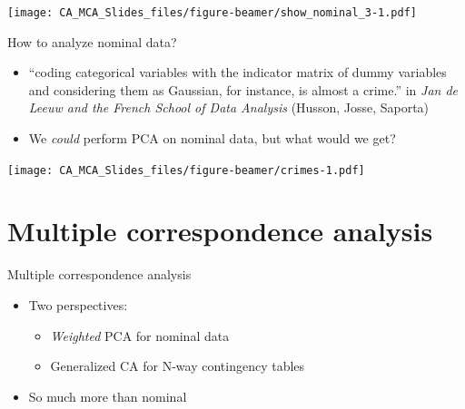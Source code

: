 \documentclass[
  ignorenonframetext,
]{beamer}
\providecommand{\tightlist}{%
  \setlength{\itemsep}{0pt}\setlength{\parskip}{0pt}}
\begin{document}
\begin{frame}

\texttt{[image: CA\_MCA\_Slides\_files/figure-beamer/show\_nominal\_3-1.pdf]}

\end{frame}

\begin{frame}{How to analyze nominal data?}
\protect\hypertarget{how-to-analyze-nominal-data}{}

\begin{itemize}[<+->]
\tightlist
\item
  ``coding categorical variables with the indicator matrix of dummy
  variables and considering them as Gaussian, for instance, is almost a
  crime.'' in \emph{Jan de Leeuw and the French School of Data Analysis}
  (Husson, Josse, Saporta)
\item
  We \emph{could} perform PCA on nominal data, but what would we get?
\end{itemize}

\end{frame}

\begin{frame}

\texttt{[image: CA\_MCA\_Slides\_files/figure-beamer/crimes-1.pdf]}

\end{frame}

\hypertarget{multiple-correspondence-analysis}{%
\section{Multiple correspondence
analysis}\label{multiple-correspondence-analysis}}

\begin{frame}{Multiple correspondence analysis}
\protect\hypertarget{multiple-correspondence-analysis-1}{}

\begin{itemize}[<+->]
\tightlist
\item
  Two perspectives:

  \begin{itemize}[<+->]
  \tightlist
  \item
    \emph{Weighted} PCA for nominal data
  \item
    Generalized CA for N-way contingency tables
  \end{itemize}
\item
  So much more than nominal
\end{itemize}

\end{frame}
\end{document}
